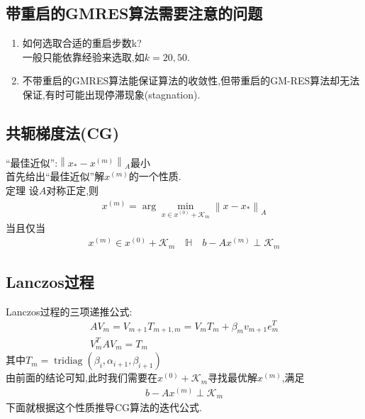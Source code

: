 \documentclass[12pt,a4paper]{article}
\begin{document}
\subsection*{带重启的GMRES算法需要注意的问题}
\begin{enumerate}[(1)]
	\item 如何选取合适的重启步数k?\\
	{\color{blue}一般只能依靠经验来选取,如$k= 20,50$}.
	\item 不带重启的GMRES算法能保证算法的收敛性,但带重启的GM-RES算法却无法保证,有时可能出现停滞现象(stagnation).
\end{enumerate}
\subsection{共轭梯度法(CG)}
{\color{blue}“最佳近似”:$\left\|x_{*}-x^{(m)}\right\|_{A}$最小}\\
首先给出“最佳近似”解$x^{(m)}$的一个性质.\\
{\color{blue}定理}
设$A$对称正定,则
\begin{align*}
	x^{(m)}=\arg \min _{x \in x^{(0)}+\mathcal{K}_{m}}\left\|x-x_{*}\right\|_{A}\tag{7.7}
\end{align*}
当且仅当
\begin{align*}
	x^{(m)} \in x^{(0)}+\mathcal{K}_{m} \quad \mathbb{H} \quad b-A x^{(m)} \perp \mathcal{K}_{m}
	\tag{7.8}
\end{align*}
\subsection*{Lanczos过程}
Lanczos过程的{\color{blue}三项递推公式}:
$$
\begin{array}{l}{A V_{m}=V_{m+1} T_{m+1, m}=V_{m} T_{m}+\beta_{m} v_{m+1} e_{m}^{T}} \\ {V_{m}^{T} A V_{m}=T_{m}}\end{array}
$$
其中$T_{m}=\operatorname{tridiag}\left(\beta_{i}, \alpha_{i+1}, \beta_{i+1}\right)$\\
由前面的结论可知,此时我们需要在$x^{(0)}+\mathcal{K}_{m}$寻找最优解$x^{(m)}$,满足
\begin{align*}
	b-A x^{(m)} \perp \mathcal{K}_{m}
	\tag{7.9}
\end{align*}
下面就根据这个性质推导CG算法的迭代公式.
\end{document}
